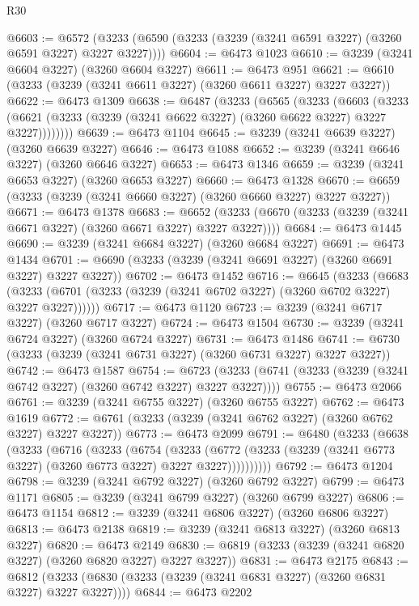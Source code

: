 \begin{lexlean}{R30}
\begin{coremodule}
@6603 := @6572 (@3233 (@6590 (@3233 (@3239 (@3241 @6591 @3227) (@3260 @6591 @3227) @3227 @3227))))
@6604 := @6473 @1023
@6610 := @3239 (@3241 @6604 @3227) (@3260 @6604 @3227)
@6611 := @6473 @951
@6621 := @6610 (@3233 (@3239 (@3241 @6611 @3227) (@3260 @6611 @3227) @3227 @3227))
@6622 := @6473 @1309
@6638 := @6487
    (@3233
      (@6565
        (@3233
          (@6603
            (@3233 (@6621 (@3233 (@3239 (@3241 @6622 @3227) (@3260 @6622 @3227) @3227 @3227))))))))
@6639 := @6473 @1104
@6645 := @3239 (@3241 @6639 @3227) (@3260 @6639 @3227)
@6646 := @6473 @1088
@6652 := @3239 (@3241 @6646 @3227) (@3260 @6646 @3227)
@6653 := @6473 @1346
@6659 := @3239 (@3241 @6653 @3227) (@3260 @6653 @3227)
@6660 := @6473 @1328
@6670 := @6659 (@3233 (@3239 (@3241 @6660 @3227) (@3260 @6660 @3227) @3227 @3227))
@6671 := @6473 @1378
@6683 := @6652 (@3233 (@6670 (@3233 (@3239 (@3241 @6671 @3227) (@3260 @6671 @3227) @3227 @3227))))
@6684 := @6473 @1445
@6690 := @3239 (@3241 @6684 @3227) (@3260 @6684 @3227)
@6691 := @6473 @1434
@6701 := @6690 (@3233 (@3239 (@3241 @6691 @3227) (@3260 @6691 @3227) @3227 @3227))
@6702 := @6473 @1452
@6716 := @6645
    (@3233
      (@6683 (@3233 (@6701 (@3233 (@3239 (@3241 @6702 @3227) (@3260 @6702 @3227) @3227 @3227))))))
@6717 := @6473 @1120
@6723 := @3239 (@3241 @6717 @3227) (@3260 @6717 @3227)
@6724 := @6473 @1504
@6730 := @3239 (@3241 @6724 @3227) (@3260 @6724 @3227)
@6731 := @6473 @1486
@6741 := @6730 (@3233 (@3239 (@3241 @6731 @3227) (@3260 @6731 @3227) @3227 @3227))
@6742 := @6473 @1587
@6754 := @6723 (@3233 (@6741 (@3233 (@3239 (@3241 @6742 @3227) (@3260 @6742 @3227) @3227 @3227))))
@6755 := @6473 @2066
@6761 := @3239 (@3241 @6755 @3227) (@3260 @6755 @3227)
@6762 := @6473 @1619
@6772 := @6761 (@3233 (@3239 (@3241 @6762 @3227) (@3260 @6762 @3227) @3227 @3227))
@6773 := @6473 @2099
@6791 := @6480
    (@3233
      (@6638
        (@3233
          (@6716
            (@3233
              (@6754
                (@3233
                  (@6772 (@3233 (@3239 (@3241 @6773 @3227) (@3260 @6773 @3227) @3227 @3227))))))))))
@6792 := @6473 @1204
@6798 := @3239 (@3241 @6792 @3227) (@3260 @6792 @3227)
@6799 := @6473 @1171
@6805 := @3239 (@3241 @6799 @3227) (@3260 @6799 @3227)
@6806 := @6473 @1154
@6812 := @3239 (@3241 @6806 @3227) (@3260 @6806 @3227)
@6813 := @6473 @2138
@6819 := @3239 (@3241 @6813 @3227) (@3260 @6813 @3227)
@6820 := @6473 @2149
@6830 := @6819 (@3233 (@3239 (@3241 @6820 @3227) (@3260 @6820 @3227) @3227 @3227))
@6831 := @6473 @2175
@6843 := @6812 (@3233 (@6830 (@3233 (@3239 (@3241 @6831 @3227) (@3260 @6831 @3227) @3227 @3227))))
@6844 := @6473 @2202

\end{coremodule}
\end{lexlean}

